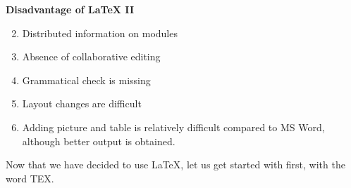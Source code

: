 \documentclass[xcolor=dvipsnames]{beamer}
\begin{document}
\begin{frame}[fragile]{\textbf{Disadvantage of \LaTeX{} II}}
\begin{enumerate}[<+->]\setcounter{enumi}{1}
 
\item Distributed information on modules
\vspace{0.2cm}
\item Absence of collaborative editing
\vspace{0.2cm}
\item Grammatical check is missing
\vspace{0.2cm}
\item Layout changes are difficult
\item Adding picture and table is relatively difficult compared to MS Word, although better output is obtained. \\

\end{enumerate}
\pause
\vspace{0.2cm}
Now that we have decided to use \LaTeX{}, let us get started with first, with the word TEX.

\end{frame}
\end{document}
